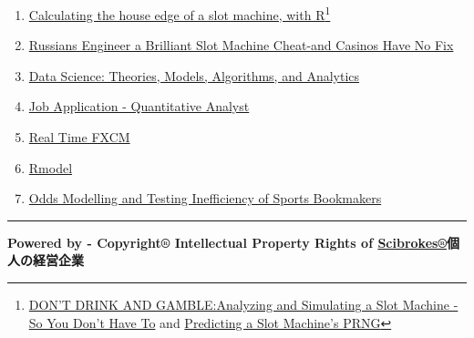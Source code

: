 \documentclass[]{book}
\providecommand{\tightlist}{%
  \setlength{\itemsep}{0pt}\setlength{\parskip}{0pt}}
\let\rmarkdownfootnote\footnote%
\def\footnote{\protect\rmarkdownfootnote}
\theoremstyle{definition}
\theoremstyle{definition}
\theoremstyle{definition}
\theoremstyle{remark}
\begin{document}
\begin{enumerate}
\def\labelenumi{\arabic{enumi}.}
\tightlist
\item
  \href{https://www.r-bloggers.com/calculating-the-house-edge-of-a-slot-machine-with-r/}{Calculating
  the house edge of a slot machine, with R}\footnote{\href{http://giorasimchoni.com/2017/05/06/2017-05-06-don-t-drink-and-gamble/}{DON'T
    DRINK AND GAMBLE:Analyzing and Simulating a Slot Machine - So You
    Don't Have To} and
    \href{https://www.schneier.com/blog/archives/2017/02/predicting_a_sl.html}{Predicting
    a Slot Machine's PRNG}}
\item
  \href{https://www.wired.com/2017/02/russians-engineer-brilliant-slot-machine-cheat-casinos-no-fix/}{Russians
  Engineer a Brilliant Slot Machine Cheat-and Casinos Have No Fix}
\item
  \href{https://srdas.github.io/MLBook}{Data Science: Theories, Models,
  Algorithms, and Analytics}
\item
  \href{github.com/englianhu/binary.com-interview-question}{Job
  Application - Quantitative Analyst}
\item
  \href{https://github.com/scibrokes/real-time-fxcm}{Real Time FXCM}
\item
  \href{https://github.com/scibrokes/Rmodel}{Rmodel}
\item
  \href{https://github.com/scibrokes/odds-modelling-and-testing-inefficiency-of-sports-bookmakers}{Odds
  Modelling and Testing Inefficiency of Sports Bookmakers}
\end{enumerate}

\begin{center}\rule{0.5\linewidth}{\linethickness}\end{center}

\textbf{Powered by - Copyright® Intellectual Property Rights of
\href{http://www.scibrokes.com}{Scibrokes®}個人の経営企業}


\end{document}

